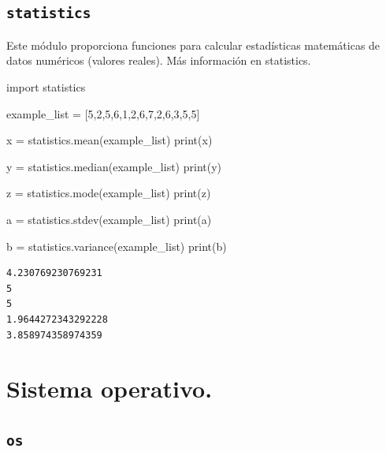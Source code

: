 \documentclass[
  spanish,
  letterpaper,
]{scrbook}
\newenvironment{Shaded}{\begin{snugshade}}{\end{snugshade}}
\newcommand{\BuiltInTok}[1]{\textcolor[rgb]{0.00,0.23,0.31}{#1}}
\newcommand{\DecValTok}[1]{\textcolor[rgb]{0.68,0.00,0.00}{#1}}
\newcommand{\ImportTok}[1]{\textcolor[rgb]{0.00,0.46,0.62}{#1}}
\newcommand{\NormalTok}[1]{\textcolor[rgb]{0.00,0.23,0.31}{#1}}
\newcommand{\OperatorTok}[1]{\textcolor[rgb]{0.37,0.37,0.37}{#1}}
\theoremstyle{definition}
\theoremstyle{remark}
\begin{document}
\subsection{\texorpdfstring{\texttt{statistics}}{statistics}}\label{statistics}

Este módulo proporciona funciones para calcular estadísticas matemáticas
de datos numéricos (valores reales). Más información en statistics.

\begin{Shaded}
\begin{Highlighting}[]
\ImportTok{import}\NormalTok{ statistics}

\NormalTok{example\_list }\OperatorTok{=}\NormalTok{ [}\DecValTok{5}\NormalTok{,}\DecValTok{2}\NormalTok{,}\DecValTok{5}\NormalTok{,}\DecValTok{6}\NormalTok{,}\DecValTok{1}\NormalTok{,}\DecValTok{2}\NormalTok{,}\DecValTok{6}\NormalTok{,}\DecValTok{7}\NormalTok{,}\DecValTok{2}\NormalTok{,}\DecValTok{6}\NormalTok{,}\DecValTok{3}\NormalTok{,}\DecValTok{5}\NormalTok{,}\DecValTok{5}\NormalTok{]}

\NormalTok{x }\OperatorTok{=}\NormalTok{ statistics.mean(example\_list)}
\BuiltInTok{print}\NormalTok{(x)}

\NormalTok{y }\OperatorTok{=}\NormalTok{ statistics.median(example\_list)}
\BuiltInTok{print}\NormalTok{(y)}

\NormalTok{z }\OperatorTok{=}\NormalTok{ statistics.mode(example\_list)}
\BuiltInTok{print}\NormalTok{(z)}

\NormalTok{a }\OperatorTok{=}\NormalTok{ statistics.stdev(example\_list)}
\BuiltInTok{print}\NormalTok{(a)}

\NormalTok{b }\OperatorTok{=}\NormalTok{ statistics.variance(example\_list)}
\BuiltInTok{print}\NormalTok{(b)}
\end{Highlighting}
\end{Shaded}

\begin{verbatim}
4.230769230769231
5
5
1.9644272343292228
3.858974358974359
\end{verbatim}

\section{Sistema operativo.}\label{sec-bib_sistema}

\subsection{\texorpdfstring{\texttt{os}}{os}}\label{os}
\end{document}
